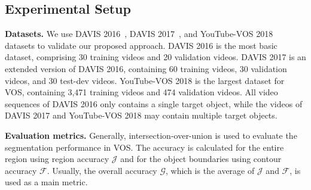 \documentclass[10pt,twocolumn,letterpaper]{article}
\begin{document}
	\subsection{Experimental Setup}
	\label{setup}
	\noindent\textbf{Datasets.} We use DAVIS 2016~\cite{DAVIS2016}, DAVIS 2017~\cite{DAVIS2017}, and YouTube-VOS 2018~\cite{YTVOS} datasets to validate our proposed approach. DAVIS 2016 is the most basic dataset, comprising 30 training videos and 20 validation videos. DAVIS 2017 is an extended version of DAVIS 2016, containing 60 training videos, 30 validation videos, and 30 test-dev videos. YouTube-VOS 2018 is the largest dataset for VOS, containing 3,471 training videos and 474 validation videos. All video sequences of DAVIS 2016 only contains a single target object, while the videos of DAVIS 2017 and YouTube-VOS 2018 may contain multiple target objects.
	
	\vspace{1mm}
	\noindent\textbf{Evaluation metrics.} Generally, intersection-over-union is used to evaluate the segmentation performance in VOS. The accuracy is calculated for the entire region using region accuracy $\mathcal{J}$ and for the object boundaries using contour accuracy $\mathcal{F}$. Usually, the overall accuracy $\mathcal{G}$, which is the average of $\mathcal{J}$ and $\mathcal{F}$, is used as a main metric. 
	
	
	
\end{document}
